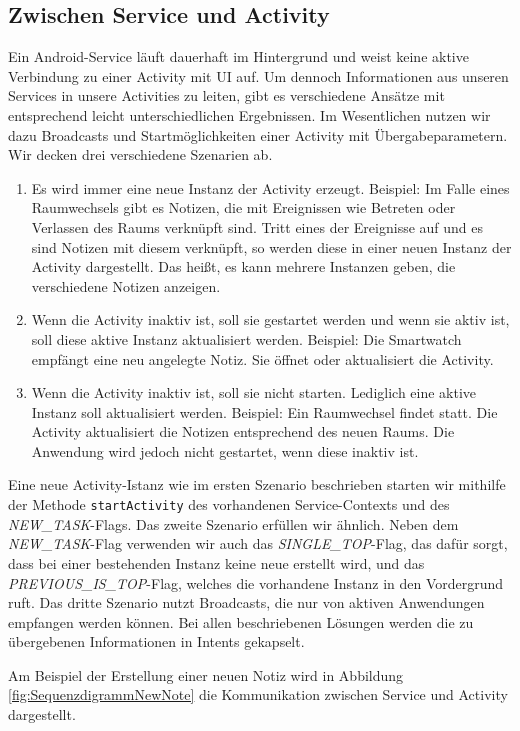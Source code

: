 \subsection{Zwischen Service und Activity}
Ein Android-Service läuft dauerhaft im Hintergrund und weist keine aktive Verbindung zu einer Activity mit UI auf. Um dennoch Informationen aus unseren Services in unsere Activities zu leiten, gibt es verschiedene Ansätze mit entsprechend leicht unterschiedlichen Ergebnissen. 
Im Wesentlichen nutzen wir dazu Broadcasts und Startmöglichkeiten einer Activity mit Übergabeparametern. 
Wir decken drei verschiedene Szenarien ab.
\begin{enumerate}
\item{Es wird immer eine neue Instanz der Activity erzeugt. Beispiel: Im Falle eines Raumwechsels gibt es Notizen, die mit Ereignissen wie Betreten oder Verlassen des Raums verknüpft sind. Tritt eines der Ereignisse auf und es sind Notizen mit diesem verknüpft, so werden diese in einer neuen Instanz der Activity dargestellt. Das heißt, es kann mehrere Instanzen geben, die verschiedene Notizen anzeigen.}
\item{Wenn die Activity inaktiv ist, soll sie gestartet werden und wenn sie aktiv ist, soll diese aktive Instanz aktualisiert werden. Beispiel: Die Smartwatch empfängt eine neu angelegte Notiz. Sie öffnet oder aktualisiert die Activity.}
\item{Wenn die Activity inaktiv ist, soll sie nicht starten. Lediglich eine aktive Instanz soll aktualisiert werden. Beispiel: Ein Raumwechsel findet statt. Die Activity aktualisiert die Notizen entsprechend des neuen Raums. Die Anwendung wird jedoch nicht gestartet, wenn diese inaktiv ist.}
\end{enumerate}

Eine neue Activity-Istanz wie im ersten Szenario beschrieben starten wir mithilfe der Methode \texttt{startActivity} des vorhandenen Service-Contexts und des \textit{NEW\_TASK}-Flags. Das zweite Szenario erfüllen wir ähnlich. Neben dem \textit{NEW\_TASK}-Flag verwenden wir auch das \textit{SINGLE\_TOP}-Flag, das dafür sorgt, dass bei einer bestehenden Instanz keine neue erstellt wird, und das \textit{PREVIOUS\_IS\_TOP}-Flag, welches die vorhandene Instanz in den Vordergrund ruft. Das dritte Szenario nutzt Broadcasts, die nur von aktiven Anwendungen empfangen werden können. Bei allen beschriebenen Lösungen werden die zu übergebenen Informationen in Intents gekapselt.

Am Beispiel der Erstellung einer neuen Notiz wird in Abbildung \ref{fig:SequenzdigrammNewNote} die Kommunikation zwischen Service und Activity dargestellt.

